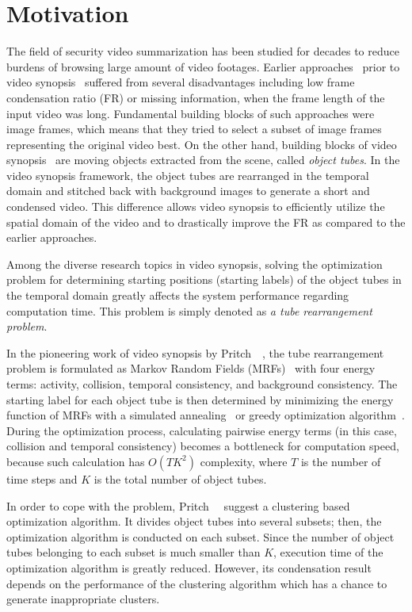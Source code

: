 \documentclass[11pt]{hyu_thesis}
\begin{document}
\section{Motivation}
\label{sec:intro:motivation}
The field of security video summarization has been studied for decades to reduce burdens of browsing large amount of video footages. Earlier approaches~\cite{Smith1997,Petrovic2005,Hoferlin2011} prior to video synopsis~\cite{Rav-Acha2006,Pritch2007,Pritch2008} suffered from several disadvantages including low frame condensation ratio (FR) or missing information, when the frame length of the input video was long. Fundamental building blocks of such approaches were image frames, which means that they tried to select a subset of image frames representing the original video best. On the other hand, building blocks of video synopsis~\cite{Rav-Acha2006,Pritch2007,Pritch2008} are moving objects extracted from the scene, called \textit{object tubes}. In the video synopsis framework, the object tubes are rearranged in the temporal domain and stitched back with background images to generate a short and condensed video. This difference allows video synopsis to efficiently utilize the spatial domain of the video and to drastically improve the FR as compared to the earlier approaches.

Among the diverse research topics in video synopsis, solving the optimization problem for determining starting positions (starting labels) of the object tubes in the temporal domain greatly affects the system performance regarding computation time. This problem is simply denoted as \textit{a tube rearrangement problem}.

In the pioneering work of video synopsis by Pritch~\etal~\cite{Pritch2008}, the tube rearrangement problem is formulated as Markov Random Fields (MRFs)~\cite{Kolmogorov2004} with four energy terms: activity, collision, temporal consistency, and background consistency. The starting label for each object tube is then determined by minimizing the energy function of MRFs with a simulated annealing~\cite{Kirkpatrick1983} or greedy optimization algorithm~\cite{Cormen2009}. During the optimization process, calculating pairwise energy terms (in this case, collision and temporal consistency) becomes a bottleneck for computation speed, because such calculation has $O(TK^2)$ complexity, where $T$ is the number of time steps and $K$ is the total number of object tubes.

In order to cope with the problem, Pritch~\etal~\cite{Pritch2009} suggest
a clustering based optimization algorithm. It divides object tubes into several subsets; then, the optimization algorithm is conducted on each subset. Since the number of object tubes belonging to each subset is much smaller than $K$, execution time of the optimization algorithm is greatly reduced. However, its condensation result depends on the performance of the clustering algorithm which has a chance to
generate inappropriate clusters.
\end{document}
